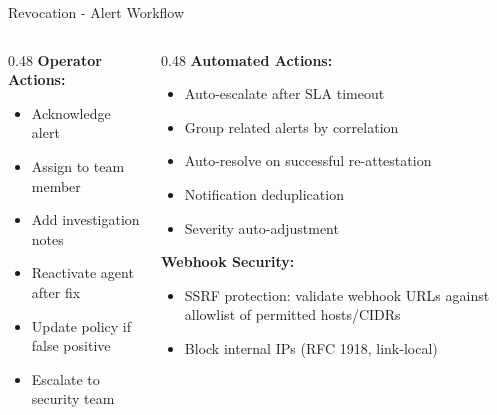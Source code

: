 \begin{frame}{Revocation - Alert Workflow}
  \scriptsize
  \begin{columns}[T]
    \begin{column}{0.48\textwidth}
      \textbf{Operator Actions:}
      \begin{itemize}
        \item Acknowledge alert
        \item Assign to team member
        \item Add investigation notes
        \item Reactivate agent after fix
        \item Update policy if false positive
        \item Escalate to security team
      \end{itemize}
    \end{column}
    \begin{column}{0.48\textwidth}
      \textbf{Automated Actions:}
      \begin{itemize}
        \item Auto-escalate after SLA timeout
        \item Group related alerts by correlation
        \item Auto-resolve on successful re-attestation
        \item Notification deduplication
        \item Severity auto-adjustment
      \end{itemize}

      \vspace{0.1cm}
      \textbf{Webhook Security:}
      \begin{itemize}
        \item SSRF protection: validate webhook URLs against allowlist of permitted hosts/CIDRs
        \item Block internal IPs (RFC 1918, link-local)
      \end{itemize}
    \end{column}
  \end{columns}
\end{frame}
